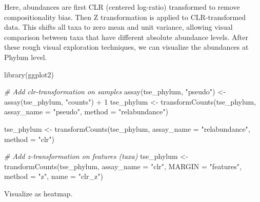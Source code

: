 \documentclass[
]{book}
\newenvironment{Shaded}{\begin{snugshade}}{\end{snugshade}}
\newcommand{\AttributeTok}[1]{\textcolor[rgb]{0.77,0.63,0.00}{#1}}
\newcommand{\CommentTok}[1]{\textcolor[rgb]{0.56,0.35,0.01}{\textit{#1}}}
\newcommand{\DecValTok}[1]{\textcolor[rgb]{0.00,0.00,0.81}{#1}}
\newcommand{\FunctionTok}[1]{\textcolor[rgb]{0.00,0.00,0.00}{#1}}
\newcommand{\NormalTok}[1]{#1}
\newcommand{\OtherTok}[1]{\textcolor[rgb]{0.56,0.35,0.01}{#1}}
\newcommand{\SpecialCharTok}[1]{\textcolor[rgb]{0.00,0.00,0.00}{#1}}
\newcommand{\StringTok}[1]{\textcolor[rgb]{0.31,0.60,0.02}{#1}}
\begin{document}
Here, abundances are first CLR (centered log-ratio) transformed to
remove compositionality bias. Then Z transformation is applied to
CLR-transformed data. This shifts all taxa to zero mean and unit
variance, allowing visual comparison between taxa that have different
absolute abundance levels. After these rough visual exploration
techniques, we can visualize the abundances at Phylum level.

\begin{Shaded}
\begin{Highlighting}[]
\FunctionTok{library}\NormalTok{(ggplot2)}

\CommentTok{\# Add clr{-}transformation on samples}
\FunctionTok{assay}\NormalTok{(tse\_phylum, }\StringTok{"pseudo"}\NormalTok{) }\OtherTok{\textless{}{-}} \FunctionTok{assay}\NormalTok{(tse\_phylum, }\StringTok{"counts"}\NormalTok{) }\SpecialCharTok{+} \DecValTok{1}
\NormalTok{tse\_phylum }\OtherTok{\textless{}{-}} \FunctionTok{transformCounts}\NormalTok{(tse\_phylum, }\AttributeTok{assay\_name =} \StringTok{"pseudo"}\NormalTok{,}
                              \AttributeTok{method =} \StringTok{"relabundance"}\NormalTok{)}

\NormalTok{tse\_phylum }\OtherTok{\textless{}{-}} \FunctionTok{transformCounts}\NormalTok{(tse\_phylum,}
                  \AttributeTok{assay\_name =} \StringTok{"relabundance"}\NormalTok{,}
          \AttributeTok{method =} \StringTok{"clr"}\NormalTok{)}

\CommentTok{\# Add z{-}transformation on features (taxa)}
\NormalTok{tse\_phylum }\OtherTok{\textless{}{-}} \FunctionTok{transformCounts}\NormalTok{(tse\_phylum, }\AttributeTok{assay\_name =} \StringTok{"clr"}\NormalTok{, }
                              \AttributeTok{MARGIN =} \StringTok{"features"}\NormalTok{,}
                              \AttributeTok{method =} \StringTok{"z"}\NormalTok{, }\AttributeTok{name =} \StringTok{"clr\_z"}\NormalTok{)}
\end{Highlighting}
\end{Shaded}

Visualize as heatmap.
\end{document}
